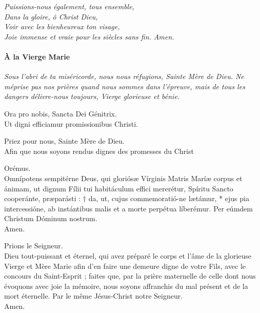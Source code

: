 \documentclass[twoside]{article}
\begin{document}
\vv \emph{Puissions-nous également, tous ensemble,}\\
\rr \emph{Dans la gloire, ô Christ Dieu,}\\
\vv \emph{Voir avec les bienheureux ton visage,}\\
\rr \emph{Joie immense et vraie pour les siècles sans fin. Amen.}

\paragraph{À la Vierge Marie}


\emph{Sous l'abri de ta miséricorde, nous nous réfugions, Sainte Mère de Dieu. Ne méprise pas nos prières quand nous sommes dans l'épreuve, mais de tous les dangers délivre-nous toujours, Vierge glorieuse et bénie.}

\begin{paracol}{2}

\vv Ora pro nobis, Sancta Dei Génitrix.\\
\rr Ut digni efficiamur promissionibus Christi.

\switchcolumn

\vv Priez pour nous, Sainte Mère de Dieu.\\
\rr Afin que nous soyons rendus dignes des promesses du Christ

\switchcolumn*

\vv Orémus.\\
Omnípotens sempitérne Deus, qui gloriósæ
Vírginis Matris Maríæ corpus et ánimam, ut
dignum Fílii tui habitáculum effici mererétur, 
Spíritu Sancto cooperánte, præparásti : †
da, ut, cujus commemoratió-ne lætámur, *
ejus pia intercessióne, ab instántibus malis et
a morte perpétua líberémur.
Per eúmdem Christum Dóminum nostrum.\\
\rr Amen.

\switchcolumn

\vv Prions le Seigneur.\\
Dieu tout-puissant et éternel, qui avez préparé le
corps et l’âme de la glorieuse Vierge et Mère
Marie afin d’en faire une demeure digne de votre 
Fils, avec le concours du Saint-Esprit ; faites que,
par la prière maternelle de celle dont nous évoquons avec joie la mémoire, nous soyons affranchis du mal présent et de la mort éternelle.
Par le même Jésus-Christ notre Seigneur.\\
\rr Amen.

\end{paracol}
\end{document}
